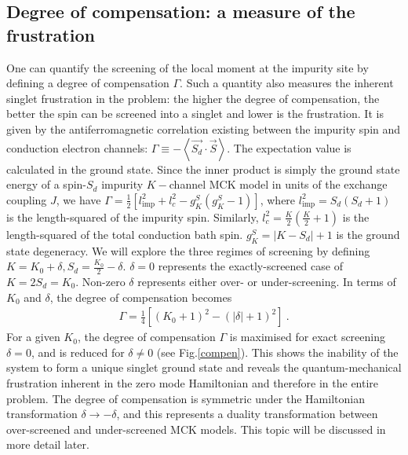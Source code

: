 \documentclass[reprint,prb,superscriptaddress]{revtex4-2}
\begin{document}
\subsection{Degree of compensation: a measure of the frustration}
\label{sec:deg_of_comp}
One can quantify the screening of the local moment at the impurity site by defining a degree of compensation \(\Gamma\). Such a quantity also measures the inherent singlet frustration in the problem: the higher the degree of compensation, the better the spin can be screened into a singlet and lower is the frustration. It is given by the antiferromagnetic correlation existing between the impurity spin and conduction electron channels: $\Gamma \equiv - \left< \vec{S_d}\cdot \vec{S}\right>$.
The expectation value is calculated in the ground state. Since the inner product is simply the ground state energy of a spin-\(S_{d}\) impurity \(K-\)channel MCK model in units of the exchange coupling \(J\), we have \(\Gamma = \frac{1}{2} \left[ l_\text{imp}^2 + l_c^2 - g^S_K\left( g^S_K - 1 \right)\right]\), where \(l_\text{imp}^2 = S_d(S_d+1)\) is the length-squared of the impurity spin. Similarly, \(l_c^2 = \frac{K}{2}\left(\frac{K}{2} + 1\right) \) is the length-squared of the total conduction bath spin. \(g^S_K = |K - S_d| + 1\) is the ground state degeneracy. We will explore the three regimes of screening by defining \(K = K_0 + \delta, S_{d} = \frac{K_0}{2} - \delta\). \(\delta=0\) represents the exactly-screened case of \(K = 2S_{d} = K_0\). Non-zero \(\delta\) represents either over- or under-screening. In terms of \(K_0\) and \(\delta\), the degree of compensation becomes
\begin{equation}\begin{aligned}
	\label{gamma}
	\Gamma = \frac{1}{4}\left[\left( K_0 + 1 \right) ^2 - \left(|\delta| + 1 \right) ^2\right]~.
\end{aligned}\end{equation}
{For a given \(K_0\), the degree of compensation $\Gamma$ is maximised for exact screening \(\delta=0\), and is reduced for \(\delta \neq 0\) (see Fig.\ref{compen}). This shows the inability of the system to form a unique singlet ground state and reveals the quantum-mechanical frustration inherent in the zero mode Hamiltonian and therefore in the entire problem.} The degree of compensation is symmetric under the Hamiltonian transformation \(\delta \to -\delta\), and this represents a duality transformation between over-screened and under-screened MCK models. This topic will be discussed in more detail later.
\end{document}

